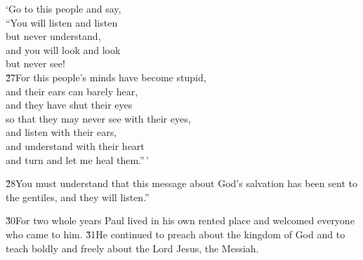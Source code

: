 \begin{poetry}
\poeml `Go to this people and say, \\
\poemll    ``You will listen and listen \\
\poemlll       but never understand, \\
\poemll    and you will look and look \\
\poemlll       but never see! \\
\poeml \v{27}For this people's minds have become stupid, \\
\poemll    and their ears can barely hear, \\
\poeml and they have shut their eyes \\
\poemll    so that they may never see with their eyes, \\
\poeml and listen with their ears, \\
\poemll    and understand with their heart \\
\poeml and turn and let me heal them.''\,'
\end{poetry}

\v{28}You must understand that this message about God's salvation has been sent to the gentiles, and they will listen.''

\v{30}For two whole years Paul lived in his own rented place and welcomed everyone who came to him. \v{31}He continued to preach about the kingdom of God and to teach boldly and freely about the Lord Jesus, the Messiah.
